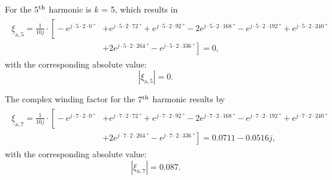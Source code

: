 \begin{solutionblock}
    For the $5\textsuperscript{th}$ harmonic is $k$ = 5, which results in
    \begin{align}
        \begin{split}
            \underline{\xi}_{\mathrm{a,}5} = \frac{1}{10j}\cdot \left[ \right. -e^{j\cdot5\cdot2\cdot\SI{0}{\degree}}
             & +e^{j\cdot5\cdot2\cdot\SI{72}{\degree}}+e^{j\cdot5\cdot2\cdot\SI{92}{\degree}}-2e^{j\cdot5\cdot2\cdot\SI{168}{\degree}}-e^{j\cdot5\cdot2\cdot\SI{192}{\degree}}
            +e^{j\cdot5\cdot2\cdot\SI{240}{\degree}}                                                                                                                           \\
             & +2e^{j\cdot5\cdot2\cdot\SI{264}{\degree}}-e^{j\cdot5\cdot2\cdot\SI{336}{\degree}}
            \left. \right]
            = 0,
        \end{split}
    \end{align}
    with the corresponding absolute value:
    \begin{equation}
        |\xi_{\mathrm{a,}5}| = 0.
    \end{equation}

    The complex winding factor for the $7\textsuperscript{th}$ harmonic results by
    \begin{align}
        \begin{split}
            \underline{\xi}_{\mathrm{a,}7} = \frac{1}{10j}\cdot \left[ \right. -e^{j\cdot7\cdot2\cdot\SI{0}{\degree}}
             & +e^{j\cdot7\cdot2\cdot\SI{72}{\degree}}+e^{j\cdot7\cdot2\cdot\SI{92}{\degree}}-2e^{j\cdot7\cdot2\cdot\SI{168}{\degree}}-e^{j\cdot7\cdot2\cdot\SI{192}{\degree}}
            +e^{j\cdot7\cdot2\cdot\SI{240}{\degree}}                                                                                                                           \\
             & +2e^{j\cdot7\cdot2\cdot\SI{264}{\degree}}-e^{j\cdot7\cdot2\cdot\SI{336}{\degree}}
            \left. \right]
            = 0.0711 - 0.0516j,
        \end{split}
    \end{align}
    with the corresponding absolute value:
    \begin{equation}
        |\xi_{\mathrm{a,}7}| = 0.087.
    \end{equation}


\end{solutionblock}



